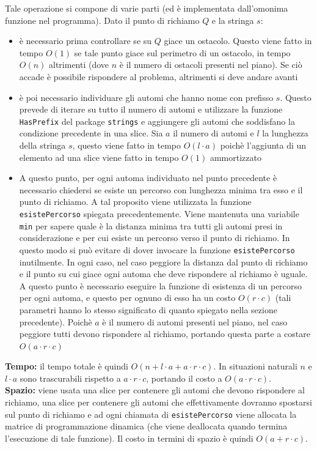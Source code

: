 \documentclass[a4paper,11pt]{article}
\begin{document}
Tale operazione si compone di varie parti (ed è implementata dall'omonima funzione nel programma). Dato il punto di richiamo $Q$ e la stringa $s$:

\begin{itemize}
    \item è necessario prima controllare se su $Q$ giace un ostacolo. Questo viene fatto in tempo $O(1)$ se tale punto giace sul perimetro di un ostacolo, in tempo $O(n)$ altrimenti (dove $n$ è il numero di ostacoli presenti nel piano). Se ciò accade è possibile rispondere al problema, altrimenti si deve andare avanti


    \item è poi necessario individuare gli automi che hanno nome con prefisso $s$. Questo prevede di iterare su tutto il numero di automi e utilizzare la funzione \texttt{HasPrefix} del package \texttt{strings} e aggiungere gli automi che soddisfano la condizione precedente in una slice. Sia $a$ il numero di automi e $l$ la lunghezza della stringa $s$, questo viene fatto in tempo $O(l \cdot a)$ poichè l'aggiunta di un elemento ad una slice viene fatto in tempo $O(1)$ ammortizzato


    \item A questo punto, per ogni automa individuato nel punto precedente è necessario chiedersi se esiste un percorso con lunghezza minima tra esso e il punto di richiamo. A tal proposito viene utilizzata la funzione \texttt{esistePercorso} spiegata precedentemente. Viene mantenuta una variabile \texttt{min} per sapere quale è la distanza minima tra tutti gli automi presi in considerazione e per cui esiste un percorso verso il punto di richiamo. In questo modo si può evitare di dover invocare la funzione \texttt{esistePercorso} inutilmente. In ogni caso, nel caso peggiore la distanza dal punto di richiamo e il punto su cui giace ogni automa che deve rispondere al richiamo è uguale. A questo punto è necessario eseguire la funzione di esistenza di un percorso per ogni automa, e questo per ognuno di esso ha un costo $O(r \cdot c)$ (tali parametri hanno lo stesso significato di quanto spiegato nella sezione precedente). Poichè $a$ è il numero di automi presenti nel piano, nel caso peggiore tutti devono rispondere al richiamo, portando questa parte a costare $O(a \cdot r \cdot c)$
\end{itemize}

\textbf{Tempo:} il tempo totale è quindi $O(n + l \cdot a + a \cdot r \cdot c)$. In situazioni naturali $n$ e $l\cdot a$ sono trascurabili rispetto a $a \cdot r \cdot c$, portando il costo a $O(a \cdot r \cdot c)$.\\
\textbf{Spazio:} viene usata una slice per contenere gli automi che devono rispondere al richiamo, una slice per contenere gli automi che effettivamente dovranno spostarsi sul punto di richiamo e ad ogni chiamata di \texttt{esistePercorso} viene allocata la matrice di programmazione dinamica (che viene deallocata quando termina l'esecuzione di tale funzione). Il costo in termini di spazio è quindi $O(a + r \cdot c)$. 
\end{document}
